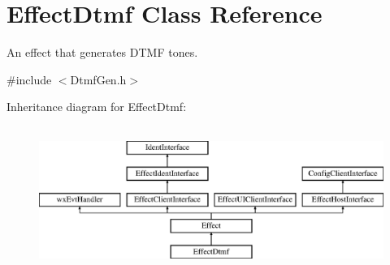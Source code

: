 \hypertarget{class_effect_dtmf}{}\section{Effect\+Dtmf Class Reference}
\label{class_effect_dtmf}


An effect that generates D\+T\+MF tones.  




{\ttfamily \#include $<$Dtmf\+Gen.\+h$>$}

Inheritance diagram for Effect\+Dtmf\+:\begin{figure}[H]
\begin{center}
\leavevmode
\includegraphics[height=4.794520cm]{class_effect_dtmf}
\end{center}
\end{figure}
